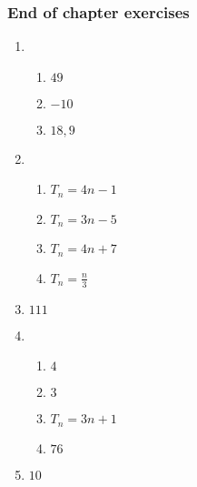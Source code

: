 {\begin{multicols}{3}
\subsubsection*{End of chapter exercises} %


\begin{enumerate}[noitemsep, label=\textbf{\arabic*}. ] 
\item %
    \begin{enumerate}[noitemsep, label=\textbf{(\alph*)} ]
  \item $49$%
    \item $-10$%
    \item $18,9$%
    \end{enumerate}


\item %
    \begin{enumerate}[noitemsep, label=\textbf{(\alph*)} ]
    \item $T_n=4n-1$%
    \item $T_n=3n-5$%
    \item $T_n=4n+7$%
    \item $T_n=\frac{n}{3}$%
    \end{enumerate}

\item $111$%
\item %
    \begin{enumerate}[noitemsep, label=\textbf{(\alph*)} ]
\item $4$%
    \item $3$%
    \item $T_n=3n+1$%
    \item $76$%
    \end{enumerate}
  

\item $10$%


\end{enumerate}
\end{multicols}}
